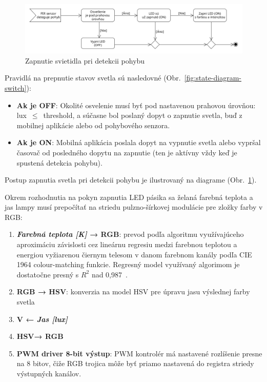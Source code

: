 \documentclass[12pt, a4paper]{article}
\begin{document}
\begin{figure}[h]
    \centering
	\includegraphics[width=\textwidth]{assets/pir-motion-detect.png}
	\caption{Zapnutie svietidla pri detekcii pohybu}
	\label{fig:pir-motion-detect}
\end{figure}

Pravidlá na prepnutie stavov svetla sú nasledovné (Obr.~\ref{fig:state-diagram-switch}):
\begin{itemize}
\item \textbf{Ak je OFF}: Okolité osvelenie musí byť pod nastavenou prahovou úrovňou: lux~$\leq$~threshold, a súčasne bol poslaný dopyt o zapnutie svetla, buď z mobilnej aplikácie alebo od pohybového senzora.
\item \textbf{Ak je ON}: Mobilná aplikácia poslala dopyt na vypnutie svetla alebo vypršal časovač od posledného dopytu na zapnutie (ten je aktívny vždy keď je spustená detekcia pohybu).
\end{itemize}
Postup zapnutia svetla pri detekcii pohybu je ilustrovaný na diagrame (Obr.~\ref{fig:pir-motion-detect}).

Okrem rozhodnutia na pokyn zapnutia LED pásika sa želaná farebná teplota a jas lampy musí prepočítať na striedu pulzno-šírkovej modulácie pre zložky farby v RGB:
\begin{enumerate}
\item \textbf{\emph{Farebná teplota [K]} → RGB}: prevod podľa algoritmu využívajúceho aproximáciu závislosti cez lineárnu regresiu medzi farebnou teplotou a energiou vyžiarenou čiernym telesom v danom farebnom kanály podľa CIE 1964 colour-matching funkcie. Regresný model využívaný algorimom je dostatočne presný s $R^2$ nad 0,987~\cite{helland_how_2012}.
\item \textbf{RGB → HSV}: konverzia na model HSV pre úpravu jasu výslednej farby svetla
\item \textbf{V ← \emph{Jas [lux]}}
\item\textbf{HSV→ RGB}
\item \textbf{PWM driver 8-bit výstup}: PWM kontrolér má nastavené rozlíšenie presne na 8 bitov, čiže RGB trojica môže byť priamo nastavená do registra striedy výstupných kanálov.
\end{enumerate}
\end{document}
